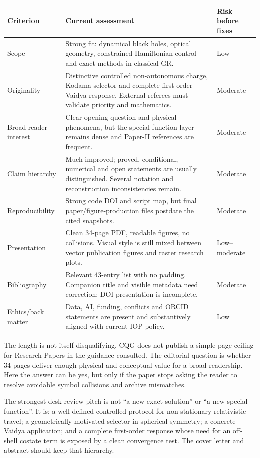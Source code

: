 \documentclass[11pt,a4paper]{article}
\begin{document}
\begin{tabularx}{\textwidth}{@{}p{}X p{}@{}}
\toprule
Criterion & Current assessment & Risk before fixes \\
\midrule
Scope & Strong fit: dynamical black holes, optical geometry, constrained Hamiltonian
control and exact methods in classical GR. & Low \\
Originality & Distinctive controlled non-autonomous charge, Kodama selector and complete
first-order Vaidya response. External referees must validate priority and mathematics. & Moderate \\
Broad-reader interest & Clear opening question and physical phenomena, but the special-function
layer remains dense and Paper-II references are frequent. & Moderate \\
Claim hierarchy & Much improved; proved, conditional, numerical and open statements are usually
distinguished. Several notation and reconstruction inconsistencies remain. & Moderate \\
Reproducibility & Strong code DOI and script map, but final paper/figure-production files postdate
the cited snapshots. & Moderate \\
Presentation & Clean 34-page PDF, readable figures, no collisions. Visual style is still mixed
between vector publication figures and raster research plots. & Low--moderate \\
Bibliography & Relevant 43-entry list with no padding. Companion title and visible metadata need
correction; DOI presentation is incomplete. & Moderate \\
Ethics/back matter & Data, AI, funding, conflicts and ORCID statements are present and substantively
aligned with current IOP policy. & Low \\
\bottomrule
\end{tabularx}

The length is not itself disqualifying. CQG does not publish a simple page ceiling for Research
Papers in the guidance consulted. The editorial question is whether 34 pages deliver enough
physical and conceptual value for a broad readership. Here the answer can be yes, but only if
the paper stops asking the reader to resolve avoidable symbol collisions and archive mismatches.

The strongest desk-review pitch is not ``a new exact solution'' or ``a new special function''.
It is: a well-defined controlled protocol for non-stationary relativistic travel; a geometrically
motivated selector in spherical symmetry; a concrete Vaidya application; and a complete
first-order response whose need for an off-shell costate term is exposed by a clean convergence
test. The cover letter and abstract should keep that hierarchy.
\end{document}
